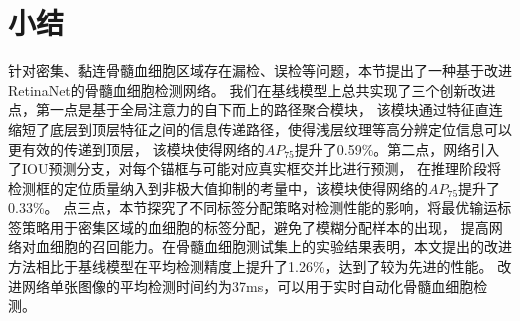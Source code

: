 \section{小结}
针对密集、黏连骨髓血细胞区域存在漏检、误检等问题，本节提出了一种基于改进RetinaNet的骨髓血细胞检测网络。
我们在基线模型上总共实现了三个创新改进点，第一点是基于全局注意力的自下而上的路径聚合模块，
该模块通过特征直连缩短了底层到顶层特征之间的信息传递路径，使得浅层纹理等高分辨定位信息可以更有效的传递到顶层，
该模块使得网络的$AP_{75}$提升了0.59\%。第二点，网络引入了IOU预测分支，对每个锚框与可能对应真实框交并比进行预测，
在推理阶段将检测框的定位质量纳入到非极大值抑制的考量中，该模块使得网络的$AP_{75}$提升了0.33\%。
点三点，本节探究了不同标签分配策略对检测性能的影响，将最优输运标签策略用于密集区域的血细胞的标签分配，避免了模糊分配样本的出现，
提高网络对血细胞的召回能力。在骨髓血细胞测试集上的实验结果表明，本文提出的改进方法相比于基线模型在平均检测精度上提升了1.26\%，达到了较为先进的性能。
改进网络单张图像的平均检测时间约为37ms，可以用于实时自动化骨髓血细胞检测。


